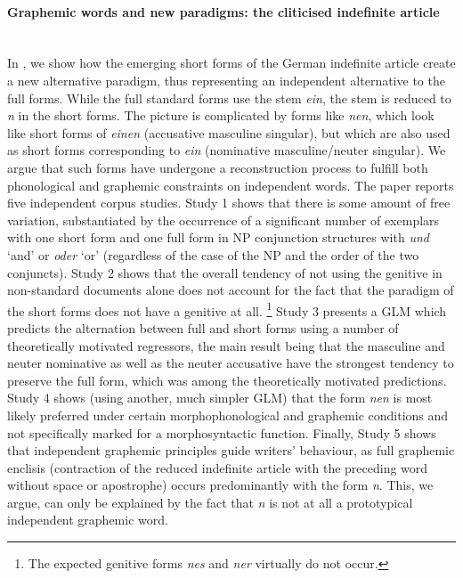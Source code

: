 \paragraph[Graphemic words and new paradigms]{Graphemic words and new paradigms: the cliticised indefinite article}
\mbox{}\\[0.5\baselineskip]\noindent
In \RODefArt, we show how the emerging short forms of the German indefinite article create a new alternative paradigm, thus representing an independent alternative to the full forms.
While the full standard forms use the stem \textit{ein}, the stem is reduced to \textit{n} in the short forms.
The picture is complicated by forms like \textit{nen}, which look like short forms of \textit{einen} (accusative masculine singular), but which are also used as short forms corresponding to \textit{ein} (nominative masculine\slash neuter singular).
We argue that such forms have undergone a reconstruction process to fulfill both phonological and graphemic constraints on independent words.
The paper reports five independent corpus studies.
Study 1 shows that there is some amount of free variation, substantiated by the occurrence of a significant number of exemplars with one short form and one full form in NP conjunction structures with \textit{und} `and' or \textit{oder} `or' (regardless of the case of the NP and the order of the two conjuncts).
Study 2 shows that the overall tendency of not using the genitive in non-standard documents alone does not account for the fact that the paradigm of the short forms does not have a genitive at all.%
\footnote{The expected genitive forms \textit{nes} and \textit{ner} virtually do not occur.}
Study 3 presents a GLM which predicts the alternation between full and short forms using a number of theoretically motivated regressors, the main result being that the masculine and neuter nominative as well as the neuter accusative have the strongest tendency to preserve the full form, which was among the theoretically motivated predictions.
Study 4 shows (using another, much simpler GLM) that the form \textit{nen} is most likely preferred under certain morphophonological and graphemic conditions and not specifically marked for a morphosyntactic function.
Finally, Study 5 shows that independent graphemic principles guide writers' behaviour, as full graphemic enclisis (contraction of the reduced indefinite article with the preceding word without space or apostrophe) occurs predominantly with the form \textit{n}.
This, we argue, can only be explained by the fact that \textit{n} is not at all a prototypical independent graphemic word.

